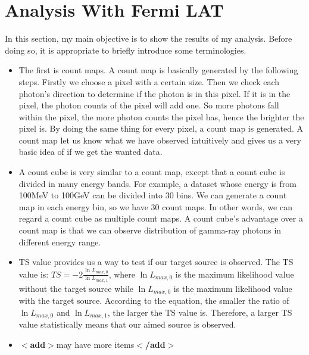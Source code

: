 \documentclass[12pt]{report}
\newcommand{\add}[1]{
  $<$\textbf{add}$>$#1$<$\textbf{/add}$>$
}
\begin{document}
      \section{Analysis With Fermi LAT}
        In this section, my main objective is to show the results of my analysis. Before doing so, it is 
        appropriate to briefly introduce some terminologies. 
        \begin{itemize}
          \item The first is count maps. A count map is basically generated by the following steps. Firstly we choose a 
            pixel with a certain size. Then we check each photon's direction to determine if the photon is in this 
            pixel. If it is in the pixel, the photon counts of the pixel will add one. So more photons fall within 
            the pixel, the more photon counts the pixel has, hence the brighter the pixel is. By doing the same thing 
            for every pixel, a count map is generated. A count map let us know what we have observed intuitively and 
            gives us a very basic idea of if we get the wanted data. 
          \item A count cube is very similar to a count map, except that a count cube is divided in many energy
            bands. For example, a dataset whose energy is from 100MeV to 100GeV can be divided into 30 bins. We can
            generate a count map in each energy bin, so we have 30 count maps. In other words, we can regard a 
            count cube as multiple count maps. A count cube's advantage over a count map is that we can 
            observe distribution of gamma-ray photons in different energy range. 
          \item TS value provides us a way to test if our target source is observed. The TS value is: 
            $TS = -2 \frac{\ln{L_{max, 0}}}{\ln{L_{max, 1}}}$, where $\ln{L_{max, 0}}$ is the maximum likelihood value 
            without the target source while $\ln{L_{max, 0}}$ is the maximum likelihood value with the target source.
            According to the equation, the smaller the ratio of $\ln{L_{max, 0}}$ and $\ln{L_{max, 1}}$, the larger
            the TS value is. Therefore, a larger TS value statistically means that our aimed source is observed. 
          \item \add{may have more items}
        \end{itemize}
\end{document}
